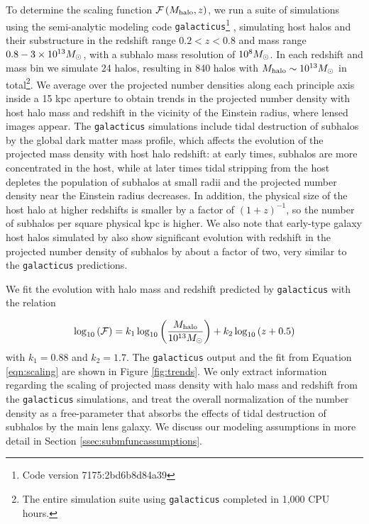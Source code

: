 To determine the scaling function $\mathcal{F} \left(M_{\rm{halo}}, z\right)$, we run a suite of simulations using the semi-analytic modeling code {\tt{galacticus}}\footnote{Code version 7175:2bd6b8d84a39} \citep{Benson12,Pullen++14}, simulating host halos and their substructure in the redshift range $0.2 < z < 0.8$ and mass range $0.8 - 3 \times 10^{13} {M_{\odot}}$, with a subhalo mass resolution of $10^8 {M_{\odot}}$. In each redshift and mass bin we simulate 24 halos, resulting in 840 halos with $M_{\rm{halo}} \sim 10^{13} {M_{\odot}}$ in total\footnote{The entire simulation suite using {\tt{galacticus}} completed in 1,000 CPU hours.}. We average over the projected number densities along each principle axis inside a 15 kpc aperture to obtain trends in the projected number density with host halo mass and redshift in the vicinity of the Einstein radius, where lensed images appear. The {\tt{galacticus}} simulations include tidal destruction of subhalos by the global dark matter mass profile, which affects the evolution of the projected mass density with host halo redshift: at early times, subhalos are more concentrated in the host, while at later times tidal stripping from the host depletes the population of subhalos at small radii and the projected number density near the Einstein radius decreases. In addition, the physical size of the host halo at higher redshifts is smaller by a factor of $\left(1+z\right)^{-1}$, so the number of subhalos per square physical kpc is higher. We also note that early-type galaxy host halos simulated by \citet{Fiacconi++16} also show significant evolution with redshift in the projected number density of subhalos by about a factor of two, very similar to the {\tt{galacticus}} predictions. 

We fit the evolution with halo mass and redshift predicted by {\tt{galacticus}} with the relation

\begin{equation}
\label{eqn:scaling}
\log_{10} \left(\mathcal{F}\right) = k_1 \log_{10} \left(\frac{M_{\rm{halo}}}{10^{13} {M_{\odot}}}\right) + k_2 \log_{10}\left(z+0.5\right)
\end{equation}
with $k_1 = 0.88$ and $k_2 = 1.7$. The {\tt{galacticus}} output and the fit from Equation \ref{eqn:scaling} are shown in Figure \ref{fig:trends}. We only extract information regarding the scaling of projected mass density with halo mass and redshift from the {\tt{galacticus}} simulations, and treat the overall normalization of the number density as a free-parameter that absorbs the effects of tidal destruction of subhalos by the main lens galaxy. We discuss our modeling assumptions in more detail in Section \ref{ssec:submfuncassumptions}.  

